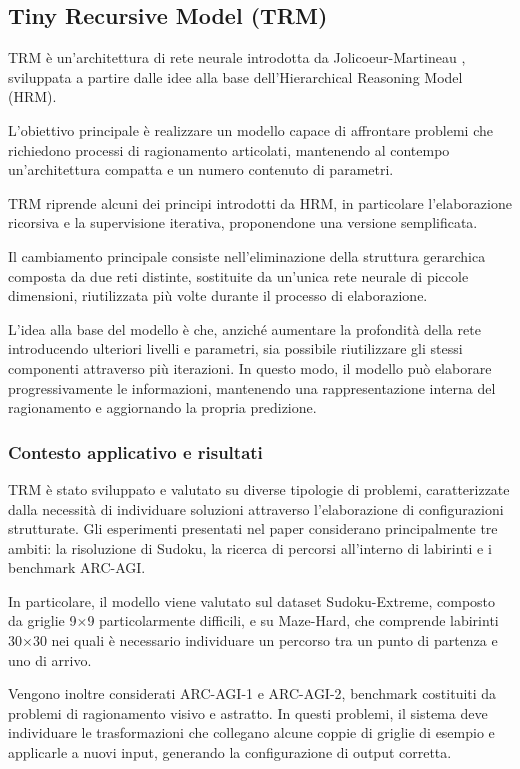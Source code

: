 
\subsection{Tiny Recursive Model (TRM)}

TRM è un'architettura di rete neurale introdotta da Jolicoeur-Martineau \cite{trm}, sviluppata a partire dalle idee alla base dell'Hierarchical Reasoning Model (HRM).

L'obiettivo principale è realizzare un modello capace di affrontare problemi che richiedono processi di ragionamento articolati, mantenendo al contempo un'architettura compatta e un numero contenuto di parametri.

TRM riprende alcuni dei principi introdotti da HRM, in particolare l'elaborazione ricorsiva e la supervisione iterativa, proponendone una versione semplificata.

Il cambiamento principale consiste nell'eliminazione della struttura gerarchica composta da due reti distinte, sostituite da un'unica rete neurale di piccole dimensioni, riutilizzata più volte durante il processo di elaborazione.

L'idea alla base del modello è che, anziché aumentare la profondità della rete introducendo ulteriori livelli e parametri, sia possibile riutilizzare gli stessi componenti attraverso più iterazioni. In questo modo, il modello può elaborare progressivamente le informazioni, mantenendo una rappresentazione interna del ragionamento e aggiornando la propria predizione.

\subsubsection{Contesto applicativo e risultati}

TRM è stato sviluppato e valutato su diverse tipologie di problemi, caratterizzate dalla necessità di individuare soluzioni attraverso l'elaborazione di configurazioni strutturate. Gli esperimenti presentati nel paper considerano principalmente tre ambiti: la risoluzione di Sudoku, la ricerca di percorsi all'interno di labirinti e i benchmark ARC-AGI.

In particolare, il modello viene valutato sul dataset Sudoku-Extreme, composto da griglie 9$\times$9 particolarmente difficili, e su Maze-Hard, che comprende labirinti 30$\times$30 nei quali è necessario individuare un percorso tra un punto di partenza e uno di arrivo.

Vengono inoltre considerati ARC-AGI-1 e ARC-AGI-2, benchmark costituiti da problemi di ragionamento visivo e astratto. In questi problemi, il sistema deve individuare le trasformazioni che collegano alcune coppie di griglie di esempio e applicarle a nuovi input, generando la configurazione di output corretta.

